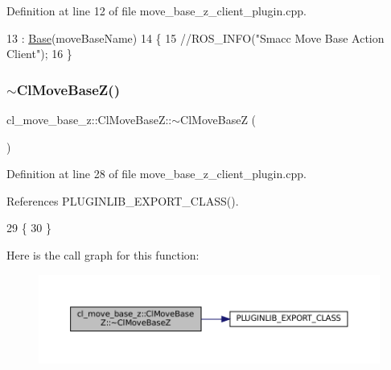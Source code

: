 Definition at line 12 of file move\+\_\+base\+\_\+z\+\_\+client\+\_\+plugin.\+cpp.


\begin{DoxyCode}
13  : \hyperlink{classcl__move__base__z_1_1ClMoveBaseZ_a5e67ee7220b881368468613fa060b664}{Base}(moveBaseName)
14 \{
15     \textcolor{comment}{//ROS\_INFO("Smacc Move Base Action Client");}
16 \}
\end{DoxyCode}
\mbox{\label{classcl__move__base__z_1_1ClMoveBaseZ_a33d1432bacc3bb364a93b04954a01f76}} 
\subsubsection{\texorpdfstring{$\sim$\+Cl\+Move\+Base\+Z()}{~ClMoveBaseZ()}}
{\footnotesize\ttfamily cl\+\_\+move\+\_\+base\+\_\+z\+::\+Cl\+Move\+Base\+Z\+::$\sim$\+Cl\+Move\+BaseZ (\begin{DoxyParamCaption}{ }\end{DoxyParamCaption})\hspace{0.3cm}{\ttfamily [virtual]}}



Definition at line 28 of file move\+\_\+base\+\_\+z\+\_\+client\+\_\+plugin.\+cpp.



References P\+L\+U\+G\+I\+N\+L\+I\+B\+\_\+\+E\+X\+P\+O\+R\+T\+\_\+\+C\+L\+A\+S\+S().


\begin{DoxyCode}
29 \{
30 \}
\end{DoxyCode}
Here is the call graph for this function\+:
\nopagebreak
\begin{figure}[H]
\begin{center}
\leavevmode
\includegraphics[width=350pt]{classcl__move__base__z_1_1ClMoveBaseZ_a33d1432bacc3bb364a93b04954a01f76_cgraph}
\end{center}
\end{figure}


